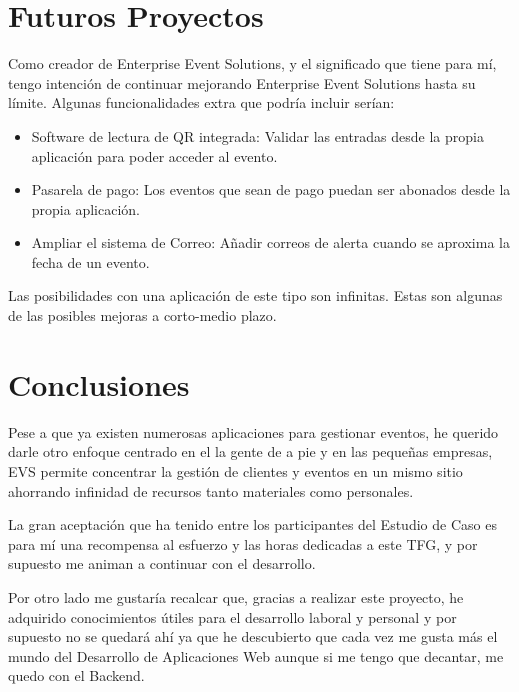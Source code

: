 \section{Futuros Proyectos}
Como creador de Enterprise Event Solutions, y el significado que tiene para mí, tengo intención de continuar mejorando Enterprise Event Solutions hasta
su límite. Algunas funcionalidades extra que podría incluir serían:
\begin{itemize}
    \item Software de lectura de QR integrada: Validar las entradas desde la propia aplicación para poder acceder al evento.
    \item Pasarela de pago: Los eventos que sean de pago puedan ser abonados desde la propia aplicación. 
    \item Ampliar el sistema de Correo: Añadir correos de alerta cuando se aproxima la fecha de un evento.
\end{itemize}

Las posibilidades con una aplicación de este tipo son infinitas. Estas son algunas de las posibles mejoras a corto-medio plazo. 

\section{Conclusiones}
Pese a que ya existen numerosas aplicaciones para gestionar eventos, he querido darle otro enfoque centrado en el la gente de a pie y en las pequeñas empresas,
EVS permite concentrar la gestión de clientes y eventos en un mismo sitio ahorrando infinidad de recursos tanto materiales como personales. 

La gran aceptación que ha tenido entre los participantes del Estudio de Caso es para mí una recompensa al esfuerzo y las horas dedicadas a este TFG, y por supuesto
me animan a continuar con el desarrollo.

Por otro lado me gustaría recalcar que, gracias a realizar este proyecto, he adquirido conocimientos útiles para el desarrollo laboral y personal y por 
supuesto no se quedará ahí ya que he descubierto que cada vez me gusta más el mundo del Desarrollo de Aplicaciones Web aunque si me tengo que decantar, me quedo con
el Backend.
